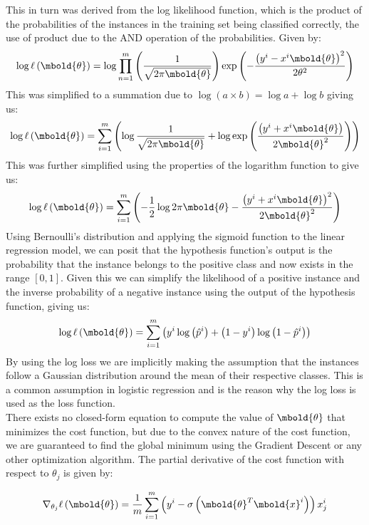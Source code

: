 \documentclass[12pt letter]{report}
\begin{document}
This in turn was derived from the log likelihood function, which is the product of the probabilities of the instances in the
training set being classified correctly, the use of product due to the AND operation of the probabilities. Given by:
\[
  \log \ell \left( \mbold{\theta} \right) = \log \prod_{n=1}^{m}  \left( \frac{1}{\sqrt{2 \pi \mbold{\theta}}} \right)  \exp \left( - \frac{ \left( y^{i} -
    x^{i}\mbold{\theta} \right)^2 }{2 \theta^2} \right)
\]
This was simplified to a summation due to $\log \left( a\times b \right) = \log a + \log b $ giving us:
\[
  \log \ell \left( \mbold{\theta} \right) = \displaystyle\sum_{i=1}^{m} \left( \log \frac{1}{\sqrt{2 \pi \mbold{\theta}}} +
  \log \exp \left( \frac{ \left( y^{i} + x^{i} \mbold{\theta} \right) }{2 \mbold{\theta}^2} \right)  \right)
\]
This was further simplified using the properties of the logarithm function to give us:
\[
  \log \ell \left( \mbold{\theta} \right) = \displaystyle\sum_{i=1}^{m} \left( - \frac{1}{2} \log 2 \pi \mbold{\theta} - \frac{ \left( y^{i} + x^{i} \mbold{\theta} \right)^2 }{2 \mbold{\theta}^2}  \right)
\]
Using Bernoulli's distribution and applying the sigmoid function to the linear regression model, we can posit that the
hypothesis function's output is the probability that the instance belongs to the positive class and now exists in the
range $[0, 1]$. Given this we can simplify the likelihood of a positive instance and the inverse probability of a
negative instance using the output of the hypothesis function, giving us:
\[
  \log \ell \left( \mbold{\theta} \right) = \displaystyle\sum_{i=1}^{m} \left( y^{i} \log \left( \hat{p}^{i} \right) + \left( 1 - y^{i} \right) \log \left( 1 - \hat{p}^{i} \right)  \right)
\]
By using the log loss we are implicitly making the assumption that the instances follow a Gaussian distribution around
the mean of their respective classes. This is a common assumption in logistic regression and is the reason why the
log loss is used as the loss function. \\

There exists no closed-form equation to compute the value of $\mbold{\theta}$ that minimizes the cost function, but due
to the convex nature of the cost function, we are guaranteed to find the global minimum using the Gradient Descent or
any other optimization algorithm. The partial derivative of the cost function with respect to $\theta_j$ is given by:

\[
  \nabla_{\theta_j} \ell \left( \mbold{\theta} \right) = \frac{1}{m} \displaystyle\sum_{i=1}^{m} \left( y^{i} - \sigma
  \left( \mbold{\theta}^{T} \mbold{x}^{i} \right) \right)  x_j^{i}
\]
\end{document}

